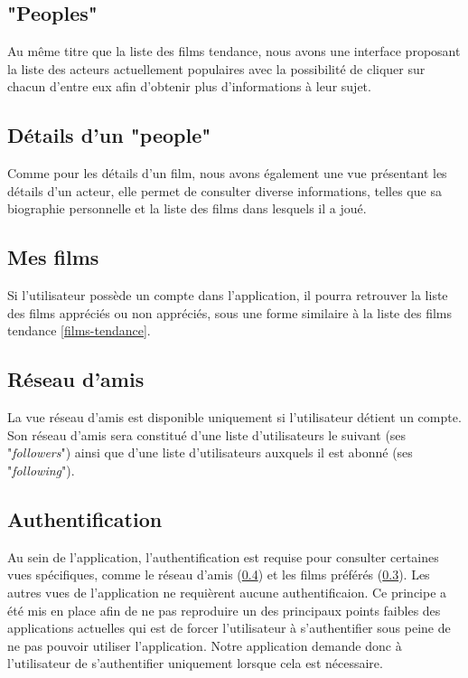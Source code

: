 \subsection{"Peoples"}
Au même titre que la liste des films tendance, nous avons une interface proposant la liste des acteurs actuellement populaires avec la possibilité de cliquer sur chacun d'entre eux afin d'obtenir plus d'informations à leur sujet.

\subsection{Détails d'un "people"}
Comme pour les détails d'un film, nous avons également une vue présentant les détails d'un acteur, elle permet de consulter diverse informations, telles que sa biographie personnelle et la liste des films dans lesquels il a joué.

\subsection{Mes films}\label{mes-films}
Si l'utilisateur possède un compte dans l'application, il pourra retrouver la liste des films appréciés ou non appréciés, sous une forme similaire à la liste des films tendance \ref{films-tendance}.

\subsection{Réseau d'amis}\label{reseau-amis}
La vue réseau d'amis est disponible uniquement si l'utilisateur détient un compte. Son réseau d'amis sera constitué d'une liste d'utilisateurs le suivant (ses "\textit{followers}") ainsi que d'une liste d'utilisateurs auxquels il est abonné (ses "\textit{following}").

\subsection{Authentification}
Au sein de l'application, l'authentification est requise pour consulter certaines vues spécifiques, comme le réseau d'amis (\ref{reseau-amis}) et les films préférés (\ref{mes-films}).
Les autres vues de l'application ne requièrent aucune authentificaion. Ce principe a été mis en place afin de ne pas reproduire un des principaux points faibles des applications actuelles qui est de forcer l'utilisateur à s'authentifier sous peine de ne pas pouvoir utiliser l'application. Notre application demande donc à l'utilisateur de s'authentifier uniquement lorsque cela est nécessaire.
 
